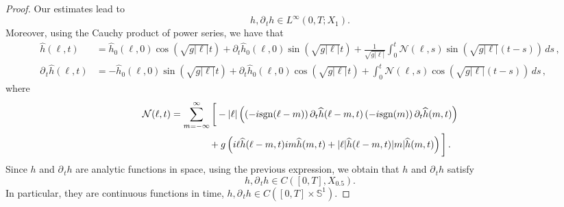 \documentclass[11pt]{article}
\theoremstyle{plain}
\theoremstyle{definition}
\theoremstyle{definition}
\def\p{\text{\bf\emph{p}}}
\def\ft #1{{\widehat{#1}}}
\def\p{{\partial\hspace{1pt}}}
\begin{document}
\begin{proof}
Our estimates lead to
$$
h,\p_{\!t}h\in L^\infty(0,T;X_{1}).
$$
Moreover, using the Cauchy product of power series, we have that
\begin{align*}
\ft{h}(\ell,t) &= \ft{h}_0(\ell,0)\cos\left(\sqrt{g|\ell|}t\right)+\partial_t\ft{h}_{0}(\ell,0)\sin\left(\sqrt{g|\ell|}t\right)+\frac{1}{\sqrt{g |\ell|}} \int_0^t \mathcal{N}(\ell,s) \sin\left( \sqrt{g|\ell|} (t-s)\right) \,ds \,,\\
\p_{\!t} \ft{h}(\ell,t) &= -\ft{h}_0(\ell,0)\sin\left(\sqrt{g|\ell|}t\right)+\partial_t\ft{h}_{0}(\ell,0)\cos\left(\sqrt{g|\ell|}t\right)+\int_0^t \mathcal{N}(\ell,s) \cos\left( \sqrt{g|\ell|} (t-s)\right) \,ds\,,
\end{align*}
where
\begin{align*}
\mathcal{N}(\ell,t) &= \sum_{m=-\infty}^{\infty}\bigg{[}-|\ell|\left(\left(-i\text{sgn}(\ell-m)\right)\p_{\!t}\ft{h}(\ell-m,t)\left(-i\text{sgn}(m)\right)\p_{\!t}\ft{h}(m,t)\right)\nonumber\\
&\qquad\qquad +g\left( i\ell\ft{h}(\ell-m,t)im \ft{h}(m,t) +
|\ell|\ft{h}(\ell-m,t)|m|\ft{h}(m,t) \right) \bigg{]}\,.
\end{align*}
Since $h$ and $\p_{\!t}h$ are analytic functions in space, using the previous expression, we obtain that $h$ and $\p_{\!t}h$ satisfy
$$
h,\p_{\!t}h\in C([0,T],X_{0.5}).
$$
In particular, they are continuous functions in time, $h,\p_{\!t}h\in C([0,T]\times \mathbb{S}^1)$.


\end{proof}
\end{document}

